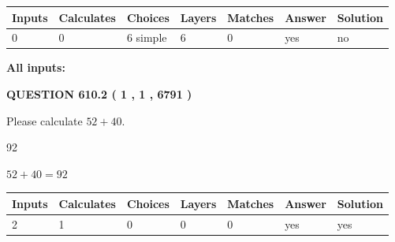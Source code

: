 \documentclass[12pt]{article}
\begin{document}
 
\noindent{}
 
 
   
   
   
   
\noindent\begin{tabular}{|l|l|l|l|l|l|l|}
 \hline
Inputs & Calculates & Choices & Layers & Matches & Answer & Solution \\ \hline
 0  & 
 0  & 
 6
  simple  
  & 
 6  & 
 0  & 
  yes & 
  no 
  \\ \hline
 \end{tabular}
   
   
   
   
\noindent{}
   
   
   
   
\noindent\vspace{0.1in}\hspace{-0.08in} {\textbf{\Large{All inputs: }}}
   
   
  
\vspace{0.2in}
  
{\textbf{\Large{QUESTION
610.2 
 ( 1 , 1 , 6791 )
}}}
  
  
 
Please calculate $ %
52 +  %
40 $.
 
 
 
\noindent{}
 
 

92
 
 
\noindent{}
 
 

 
 
 
\noindent{}
 
 

$ %
52 +  %
40=   %
92$
 
 
\noindent{}
 
 

 
   
   
   
   
\noindent\begin{tabular}{|l|l|l|l|l|l|l|}
 \hline
Inputs & Calculates & Choices & Layers & Matches & Answer & Solution \\ \hline
 2  & 
 1  & 
 0
  & 
 0  & 
 0  & 
  yes & 
  yes 
  \\ \hline
 \end{tabular}
   
\end{document}
